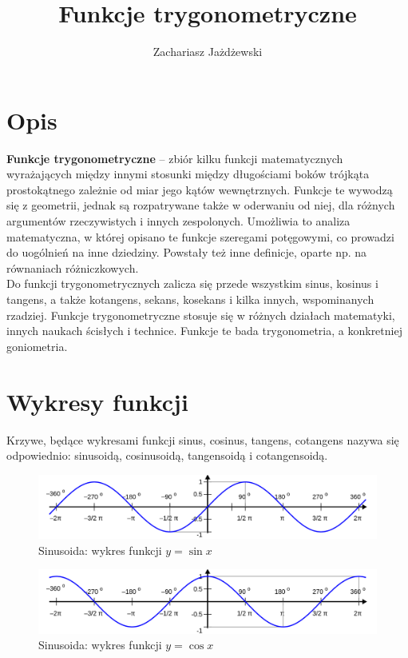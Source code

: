\documentclass[a4paper,12pt]{article}
\title{Funkcje trygonometryczne}
\author{Zachariasz Jażdżewski}
\begin{document}
\maketitle

\tableofcontents

\section{Opis}

\textbf{Funkcje trygonometryczne} – zbiór kilku funkcji matematycznych wyrażających między innymi stosunki między długościami boków trójkąta prostokątnego zależnie od miar jego kątów wewnętrznych. Funkcje te wywodzą się z geometrii, jednak są rozpatrywane także w oderwaniu od niej, dla różnych argumentów rzeczywistych i innych zespolonych. Umożliwia to analiza matematyczna, w której opisano te funkcje szeregami potęgowymi, co prowadzi do uogólnień na inne dziedziny. Powstały też inne definicje, oparte np. na równaniach różniczkowych.\\

Do funkcji trygonometrycznych zalicza się przede wszystkim sinus, kosinus i tangens, a także kotangens, sekans, kosekans i kilka innych, wspominanych rzadziej. Funkcje trygonometryczne stosuje się w różnych działach matematyki, innych naukach ścisłych i technice. Funkcje te bada trygonometria, a konkretniej goniometria.

\newpage

\section{Wykresy funkcji}

Krzywe, będące wykresami funkcji sinus, cosinus, tangens, cotangens nazywa się odpowiednio: sinusoidą, cosinusoidą, tangensoidą i cotangensoidą. 

\begin{figure}[h]
    \centering
    \includegraphics[width=\textwidth]{Sin_proportional.png}
    \caption{Sinusoida: wykres funkcji $y = \sin x$}
    \label{fig:wykres-sinus}
\end{figure}

\begin{figure}[h]
    \centering
    \includegraphics[width=\textwidth]{Cos_proportional.png}
    \caption{Sinusoida: wykres funkcji $y = \cos x$}
    \label{fig:wykres-cosinus}
\end{figure}
\end{document}
